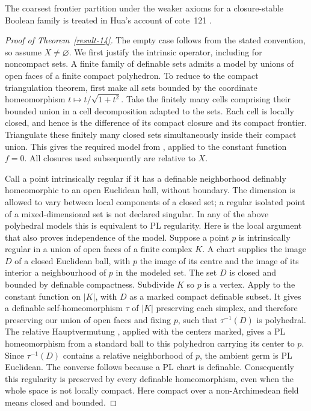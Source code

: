 \documentclass[11pt,a4paper]{article}
\theoremstyle{definition}
\begin{document}
The coarsest frontier partition under the weaker axioms for a
closure-stable Boolean family is treated in Hua's account of cote~121
\cite[Theorems~71.1--71.2, pp.~341--342]{HuaMontpellier2026}.
\begin{proof}[Proof of Theorem~\ref{result-14}]
The empty case follows from the stated convention, so assume
$X\ne\varnothing$.
We first justify the intrinsic operator, including for noncompact
sets. A finite family of definable sets admits a model by unions
of open faces of a finite compact polyhedron. To reduce to the
compact triangulation theorem, first make all sets bounded by the
coordinate homeomorphism $t\mapsto t/\sqrt{1+t^2}$.
Take the finitely many cells comprising their bounded union in
a cell decomposition adapted to the sets. Each cell is locally
closed, and hence is the difference of its compact closure and
its compact frontier. Triangulate these finitely many closed
sets simultaneously inside their compact union. This gives the
required model from \cite[Theorem 2.2(1), p.~6]{Shiota2010},
applied to the constant function $f=0$.
All closures used subsequently are relative to $X$.

Call a point intrinsically regular if it has a definable
neighborhood definably homeomorphic to an open Euclidean ball,
without boundary. The dimension is allowed to vary between local
components of a closed set; a regular isolated point of a
mixed-dimensional set is not declared singular. In any of the above polyhedral models this
is equivalent to PL regularity. Here is the local argument that
also proves independence of the model. Suppose a point $p$ is
intrinsically regular in a union of open faces of a finite
complex $K$. A chart supplies the image $D$ of a closed Euclidean
ball, with $p$ the image of its centre and the image of its interior
a neighbourhood of $p$ in the modeled set. The set $D$ is closed and
bounded by definable compactness. Subdivide $K$ so $p$ is a vertex.
Apply \cite[Theorem 2.2(2), p.~6]{Shiota2010} to the constant
function on $|K|$, with $D$ as a marked compact definable subset.
It gives a definable self-homeomorphism $\tau$ of $|K|$
preserving each simplex, and therefore preserving
our union of open faces and fixing $p$, such that $\tau^{-1}(D)$
is polyhedral. The relative Hauptvermutung
\cite[Theorem 2.1, p.~5]{Shiota2010}, applied with the centers
marked, gives a PL homeomorphism from a standard ball to this
polyhedron carrying its center to $p$. Since $\tau^{-1}(D)$
contains a relative neighborhood of $p$, the ambient germ is
PL Euclidean. The converse follows because a PL chart is definable.
Consequently this regularity is preserved by every definable
homeomorphism, even when the whole space is not locally compact.
Here compact over a non-Archimedean field means closed and bounded.


\end{proof}
\end{document}
